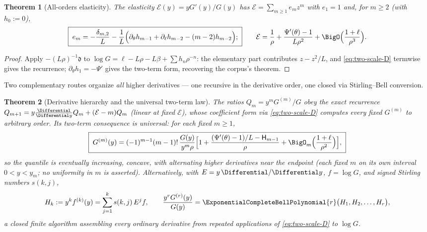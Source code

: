 \documentclass[11pt,oneside]{article}
\numberwithin{equation}{section}
\newtheorem{theorem}{Theorem}[section]
\theoremstyle{definition}
\theoremstyle{remark}
\newcommand{\Hnum}{\mathsf H}
\begin{document}
\begin{theorem}[All-orders elasticity]
\label{thm:elasticity}
The elasticity
$\mathcal E(y)=yG'(y)/G(y)$ has
$\mathcal E=\sum_{m\ge1}e_mz^{m}$ with $e_1=1$ and, for $m\ge2$
(with $h_0:=0$),
\begin{equation}
 \boxed{\;
 e_m=-\frac{\delta_{m,2}}{L}
 -\frac1L\Bigl(
 \partial_\theta h_{m-1}
 +\partial_\ell h_{m-2}-(m-2)h_{m-2}
 \Bigr);
 \;}
 \qquad
 \mathcal E
 =\frac1\rho+\frac{\Psi'(\theta)-1}{L\rho^{2}}
 +\BigO\Bigl(\frac{1+\ell}{\rho^{3}}\Bigr).
 \label{eq:elasticity}
\end{equation}
\end{theorem}

\begin{proof}
Apply $-(L\rho)^{-1}\mathfrak d$ to
$\log G=\ell-L\rho-L\beta+\sum h_n\rho^{-n}$: the elementary part
contributes $z-z^{2}/L$, and \eqref{eq:two-scale-D} termwise gives
the recurrence; $\partial_\theta h_1=-\Psi'$ gives the two-term
form, recovering the corpus's theorem.
\end{proof}

Two complementary routes organize \emph{all} higher derivatives ---
one recursive in the derivative order, one closed via Stirling--Bell
conversion.

\begin{theorem}[Derivative hierarchy and the universal two-term law]
\label{thm:derivative-hierarchy}
The ratios $Q_m=y^{m}G^{(m)}/G$ obey the exact recurrence
$Q_{m+1}=y\tfrac{\Differential}{\Differential y}Q_m+(\mathcal E-m)Q_m$ (linear at fixed
$\mathcal E$), whose coefficient form via
\eqref{eq:two-scale-D} computes every fixed $G^{(m)}$ to arbitrary
order.  Its two-term consequence is universal: for each fixed
$m\ge1$,
\begin{equation}
 \boxed{\;
 G^{(m)}(y)=(-1)^{m-1}(m-1)!\,
 \frac{G(y)}{y^{m}\rho}
 \Bigl[1+\frac{(\Psi'(\theta)-1)/L-\Hnum_{m-1}}{\rho}
 +\BigO_m\Bigl(\frac{1+\ell}{\rho^{2}}\Bigr)\Bigr],
 \;}
 \label{eq:two-term-derivative}
\end{equation}
so the quantile is eventually increasing, concave, with alternating
higher derivatives near the endpoint (each fixed $m$ on its own
interval $0<y<y_m$; no uniformity in $m$ is asserted).
Alternatively, with $E=y\,\Differential/\Differential y$, $f=\log G$, and signed
Stirling numbers $s(k,j)$,
\begin{equation}
 H_k:=y^{k}f^{(k)}(y)=\sum_{j=1}^{k}s(k,j)\,E^{j}f,
 \qquad
 \frac{y^{r}G^{(r)}(y)}{G(y)}
 =\ExponentialCompleteBellPolynomial{r}\bigl(H_1,H_2,\dots,H_r\bigr),
 \label{eq:stirling-bell}
\end{equation}
a closed finite algorithm assembling every ordinary derivative from
repeated applications of \eqref{eq:two-scale-D} to $\log G$.
\end{theorem}
\end{document}
